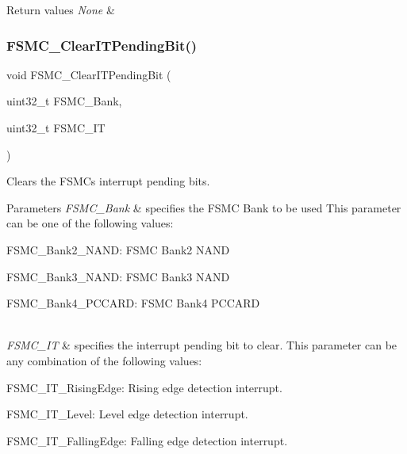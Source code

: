 \begin{DoxyRetVals}{Return values}
{\em None} & \\
\hline
\end{DoxyRetVals}
\mbox{\label{group___f_s_m_c___exported___functions_gad9387e7674b8a376256a3378649e004e}} 
\subsubsection{\texorpdfstring{FSMC\_ClearITPendingBit()}{FSMC\_ClearITPendingBit()}}
{\footnotesize\ttfamily void F\+S\+M\+C\+\_\+\+Clear\+I\+T\+Pending\+Bit (\begin{DoxyParamCaption}\item[{uint32\+\_\+t}]{F\+S\+M\+C\+\_\+\+Bank,  }\item[{uint32\+\_\+t}]{F\+S\+M\+C\+\_\+\+IT }\end{DoxyParamCaption})}



Clears the F\+S\+MC\textquotesingle{}s interrupt pending bits. 


\begin{DoxyParams}{Parameters}
{\em F\+S\+M\+C\+\_\+\+Bank} & specifies the F\+S\+MC Bank to be used This parameter can be one of the following values\+: \begin{DoxyItemize}
\item F\+S\+M\+C\+\_\+\+Bank2\+\_\+\+N\+A\+ND\+: F\+S\+MC Bank2 N\+A\+ND \item F\+S\+M\+C\+\_\+\+Bank3\+\_\+\+N\+A\+ND\+: F\+S\+MC Bank3 N\+A\+ND \item F\+S\+M\+C\+\_\+\+Bank4\+\_\+\+P\+C\+C\+A\+RD\+: F\+S\+MC Bank4 P\+C\+C\+A\+RD \end{DoxyItemize}
\\
\hline
{\em F\+S\+M\+C\+\_\+\+IT} & specifies the interrupt pending bit to clear. This parameter can be any combination of the following values\+: \begin{DoxyItemize}
\item F\+S\+M\+C\+\_\+\+I\+T\+\_\+\+Rising\+Edge\+: Rising edge detection interrupt. \item F\+S\+M\+C\+\_\+\+I\+T\+\_\+\+Level\+: Level edge detection interrupt. \item F\+S\+M\+C\+\_\+\+I\+T\+\_\+\+Falling\+Edge\+: Falling edge detection interrupt. \end{DoxyItemize}
\\
\hline
\end{DoxyParams}

